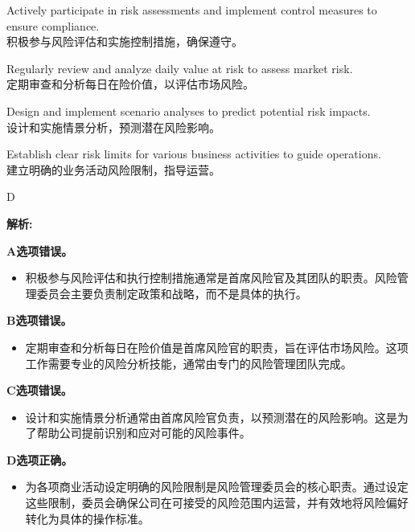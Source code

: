 \documentclass{article}
\newenvironment{explanation}
{\textbf{解析:}\par}
{\par}
\begin{document}
\begin{choices}
    \item Actively participate in risk assessments and implement control measures to ensure compliance.\\
    积极参与风险评估和实施控制措施，确保遵守。
    \item Regularly review and analyze daily value at risk to assess market risk.\\
    定期审查和分析每日在险价值，以评估市场风险。
    \item Design and implement scenario analyses to predict potential risk impacts.\\
    设计和实施情景分析，预测潜在风险影响。
    \item Establish clear risk limits for various business activities to guide operations.\\
    建立明确的业务活动风险限制，指导运营。
\end{choices}

\begin{correctanswer}
    D
\end{correctanswer}

\begin{explanation}
    \textbf{A选项错误。}
    \begin{itemize}
        \item 积极参与风险评估和执行控制措施通常是首席风险官及其团队的职责。风险管理委员会主要负责制定政策和战略，而不是具体的执行。
    \end{itemize}
    
    \textbf{B选项错误。}
    \begin{itemize}
        \item 定期审查和分析每日在险价值是首席风险官的职责，旨在评估市场风险。这项工作需要专业的风险分析技能，通常由专门的风险管理团队完成。
    \end{itemize}
    
    \textbf{C选项错误。}
    \begin{itemize}
        \item 设计和实施情景分析通常由首席风险官负责，以预测潜在的风险影响。这是为了帮助公司提前识别和应对可能的风险事件。
    \end{itemize}
    
    \textbf{D选项正确。}
    \begin{itemize}
        \item 为各项商业活动设定明确的风险限制是风险管理委员会的核心职责。通过设定这些限制，委员会确保公司在可接受的风险范围内运营，并有效地将风险偏好转化为具体的操作标准。
    \end{itemize}
\end{explanation}
\end{document}
